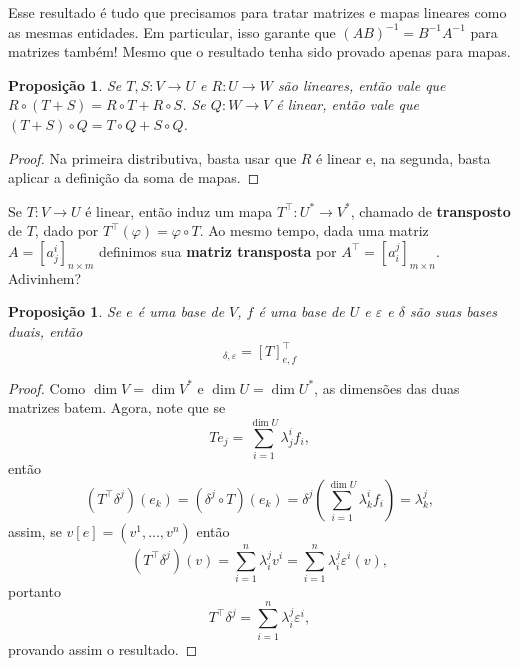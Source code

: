 \documentclass{article}
\newtheorem{proposition}[definition]{Proposição}
\renewcommand{\phi}{\varphi}
\begin{document}
Esse resultado é tudo que precisamos para tratar matrizes e mapas lineares como as mesmas entidades. Em particular, isso garante que $(AB)^{-1} = B^{-1}A^{-1}$ para matrizes também! Mesmo que o resultado tenha sido provado apenas para mapas.

\begin{proposition}
    Se $T, S \colon V \to U$ e $R \colon U \to W$ são lineares, então vale que $R \circ (T + S) = R \circ T + R \circ S$. Se $Q \colon W \to V$ é linear, então vale que $(T + S) \circ Q = T \circ Q + S \circ Q$.
\end{proposition}
\begin{proof}
    Na primeira distributiva, basta usar que $R$ é linear e, na segunda, basta aplicar a definição da soma de mapas.
\end{proof}

Se $T \colon V \to U$ é linear, então induz um mapa $T^\top \colon U^* \to V^*$, chamado de \textbf{transposto} de $T$, dado por $T^\top(\phi) = \phi \circ T$. Ao mesmo tempo, dada uma matriz $A = [a^i_j]_{n \times m}$ definimos sua \textbf{matriz transposta} por $A^\top = [a^j_i]_{m \times n}$. Adivinhem?

\begin{proposition}
    Se $e$ é uma base de $V$, $f$ é uma base de $U$ e $\varepsilon$ e $\delta$ são suas bases duais, então \begin{equation}
        [T']_{\delta, \varepsilon} = [T]_{e, f}^\top
    \end{equation}
\end{proposition}
\begin{proof}
    Como $\dim V = \dim V^*$ e $\dim U = \dim U^*$, as dimensões das duas matrizes batem. Agora, note que se \begin{equation}
        Te_j = \sum_{i = 1}^{\dim U} \lambda^i_j f_i,
    \end{equation} então \begin{equation}
        (T^\top \delta^j)(e_k) = (\delta^j \circ T)(e_k) = \delta^j\left(\sum_{i = 1}^{\dim U} \lambda^i_k f_i\right) = \lambda^j_k,
    \end{equation} assim, se $v[e] = (v^1, \dots, v^n)$ então \begin{equation}
        (T^\top\delta^j)(v) = \sum_{i = 1}^{n} \lambda^j_i v^i = \sum_{i = 1}^n \lambda^j_i \varepsilon^i(v),
    \end{equation} portanto \begin{equation}
        T^\top \delta^j = \sum_{i = 1}^n \lambda^j_i \varepsilon^i,
    \end{equation} provando assim o resultado.
\end{proof}
\end{document}
